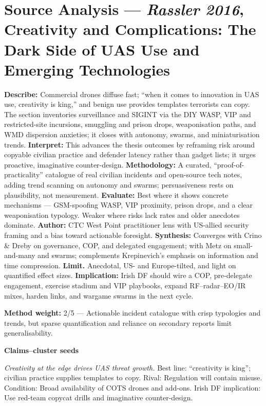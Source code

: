 \section*{Source Analysis — \textit{Rassler 2016}, Creativity and Complications: The Dark Side of UAS Use and Emerging Technologies}
\textbf{Describe:} Commercial drones diffuse fast; “when it comes to innovation in UAS use, creativity is king,” and benign use provides templates terrorists can copy. The section inventories surveillance and SIGINT via the DIY WASP, VIP and restricted-site incursions, smuggling and prison drops, weaponisation paths, and WMD dispersion anxieties; it closes with autonomy, swarms, and miniaturisation trends.
\textbf{Interpret:} This advances the thesis outcomes by reframing risk around copyable civilian practice and defender latency rather than gadget lists; it urges proactive, imaginative counter-design.
\textbf{Methodology:} A curated, “proof-of-practicality” catalogue of real civilian incidents and open-source tech notes, adding trend scanning on autonomy and swarms; persuasiveness rests on plausibility, not measurement.
\textbf{Evaluate:} Best where it shows concrete mechanisms — GSM-spoofing WASP, VIP proximity, prison drops, and a clear weaponisation typology. Weaker where risks lack rates and older anecdotes dominate.
\textbf{Author:} CTC West Point practitioner lens with US-allied security framing and a bias toward actionable foresight.
\textbf{Synthesis:} Converges with Crino & Dreby on governance, COP, and delegated engagement; with Metz on small-and-many and swarms; complements Krepinevich’s emphasis on information and time compression.
\textbf{Limit.} Anecdotal, US- and Europe-tilted, and light on quantified effect sizes.
\textbf{Implication:} Irish DF should wire a COP, pre-delegate engagement, exercise stadium and VIP playbooks, expand RF–radar–EO/IR mixes, harden links, and wargame swarms in the next cycle.

\textbf{Method weight:} 2/5 — Actionable incident catalogue with crisp typologies and trends, but sparse quantification and reliance on secondary reports limit generalisability.

\textbf{Claims–cluster seeds}

\textit{Creativity at the edge drives UAS threat growth.} Best line: “creativity is king”; civilian practice supplies templates to copy. Rival: Regulation will contain misuse. Condition: Broad availability of COTS drones and add-ons. Irish DF implication: Use red-team copycat drills and imaginative counter-design.

